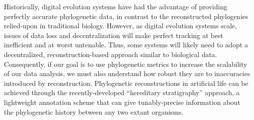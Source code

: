 Historically, digital evolution systems have had the advantage of providing perfectly accurate phylogenetic data, in contrast to the reconstructed phylogenies relied-upon in traditional biology.
However, as digital evolution systems scale, issues of data loss and decentralization will make perfect tracking at best inefficient and at worst untenable.
Thus, some systems will likely need to adopt a decentralized, reconstruction-based approach similar to biological data.
Consequently, if our goal is to use phylogenetic metrics to increase the scalability of our data analysis, we must also understand how robust they are to inaccuracies introduced by reconstruction.
Phylogenetic reconstructions in artificial life can be achieved through the recently-developed ``hereditary stratigraphy'' approach, a lightweight annotation scheme that can give tunably-precise information about the phylogenetic history between any two extant organisms.

